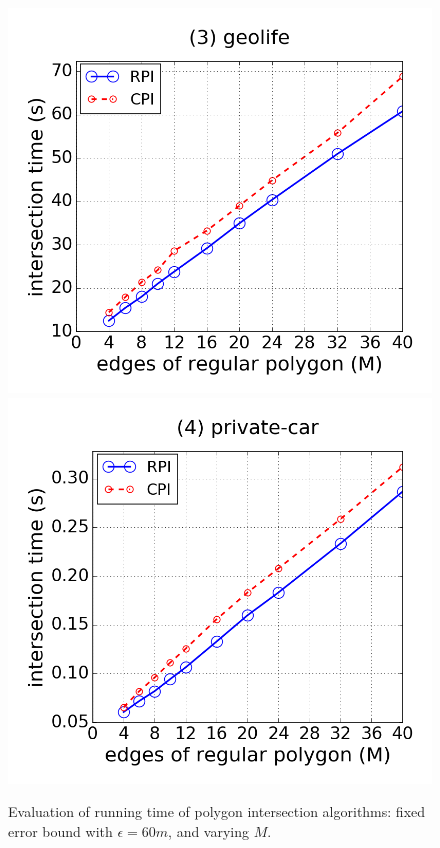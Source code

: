 \begin{figure}[tb!]
\includegraphics[scale = 0.250]{figures/Exp-M-poly-time-geolife.png}
\includegraphics[scale = 0.250]{figures/Exp-M-poly-time-private.png}
\vspace{-2ex}
\caption{\small Evaluation of running time of polygon intersection algorithms: fixed error bound with $\epsilon=60m$, and varying $M$.}
\label{fig:m-poly-time}
\vspace{-2ex}
\end{figure}


